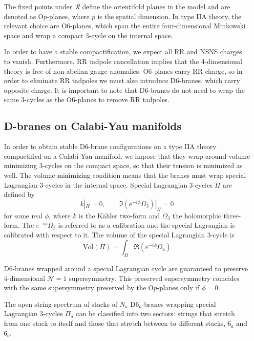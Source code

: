 The fixed points under $\mathcal R$ define the orientifold planes in the model and are denoted
as O$p$-planes, where $p$ is the spatial dimension.
In type IIA theory, the relevant choice are O$6$-planes,
which span the entire four-dimensional Minkowski space and wrap a compact $3$-cycle on the internal space.

In order to have a stable compactification, we expect all RR and NSNS charges to vanish.
Furthermore, RR tadpole cancellation implies that the 4-dimensional theory is free of non-abelian gauge anomalies.
O$6$-planes carry RR charge, so in order to eliminate RR tadpoles we must also introduce D$6$-branes,
which carry opposite charge.
It is important to note that D$6$-branes do not need to wrap the same 3-cycles as the O$6$-planes
to remove RR tadpoles.

\subsection{D-branes on Calabi-Yau manifolds}

In order to obtain stable D6-brane configurations on a type IIA theory compactified on a Calabi-Yau manifold, 
we impose that they wrap around volume minimizing 3-cycles on the compact space, so that their tension is minimized as well.
The volume minimizing condition means that the branes must wrap special Lagrangian 3-cycles in the internal space.
Special Lagrangian 3-cycles $\Pi$ are defined by
\begin{equation}
  k|_\Pi = 0 , \qquad \Im (e^{-i\phi}\Omega_3)|_\Pi=0
\end{equation}
for some real $\phi$, where $k$ is the Kähler two-form and $\Omega_3$ the holomorphic three-form.
The $e^{-i\phi}\Omega_3$ is referred to as a calibration and the special Lagrangian is calibrated with respect to it.%
The volume of the special Lagrangian 3-cycle is
\begin{equation}
  \mathrm{Vol}(\Pi)=\int_\Pi \Re(e^{-i\phi}\Omega_3)
\end{equation}

D6-branes wrapped around a special Lagrangian cycle are guaranteed to preserve 4-dimensional $\mathcal N=1$ supersymmetry. 
This preserved supersymmetry coincides with the same supersymmetry preserved by the O$p$-planes only if $\phi=0$.

The open string spectrum of stacks of $N_a$ D$6_a$-branes wrapping special Lagrangian 3-cycles $\Pi_a$ 
can be classified into two sectors: strings that stretch from one stack to itself and those that stretch between to different stacks, $6_a$ and $6_b$.

